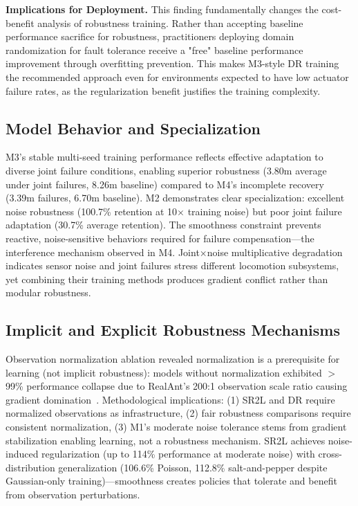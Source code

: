 \documentclass[conference]{IEEEtran}
\begin{document}
\textbf{Implications for Deployment.} This finding fundamentally changes the cost-benefit analysis of robustness training. Rather than accepting baseline performance sacrifice for robustness, practitioners deploying domain randomization for fault tolerance receive a "free" baseline performance improvement through overfitting prevention. This makes M3-style DR training the recommended approach even for environments expected to have low actuator failure rates, as the regularization benefit justifies the training complexity.

\subsection{Model Behavior and Specialization}

M3's stable multi-seed training performance reflects effective adaptation to diverse joint failure conditions, enabling superior robustness (3.80m average under joint failures, 8.26m baseline) compared to M4's incomplete recovery (3.39m failures, 6.70m baseline). M2 demonstrates clear specialization: excellent noise robustness (100.7\% retention at 10$\times$ training noise) but poor joint failure adaptation (30.7\% average retention). The smoothness constraint prevents reactive, noise-sensitive behaviors required for failure compensation—the interference mechanism observed in M4. Joint×noise multiplicative degradation indicates sensor noise and joint failures stress different locomotion subsystems, yet combining their training methods produces gradient conflict rather than modular robustness.

\subsection{Implicit and Explicit Robustness Mechanisms}

Observation normalization ablation revealed normalization is a prerequisite for learning (not implicit robustness): models without normalization exhibited $>$99\% performance collapse due to RealAnt's 200:1 observation scale ratio causing gradient domination~\cite{andrychowicz2021matters}. Methodological implications: (1) SR2L and DR require normalized observations as infrastructure, (2) fair robustness comparisons require consistent normalization, (3) M1's moderate noise tolerance stems from gradient stabilization enabling learning, not a robustness mechanism. SR2L achieves noise-induced regularization (up to 114\% performance at moderate noise) with cross-distribution generalization (106.6\% Poisson, 112.8\% salt-and-pepper despite Gaussian-only training)—smoothness creates policies that tolerate and benefit from observation perturbations.
\end{document}
